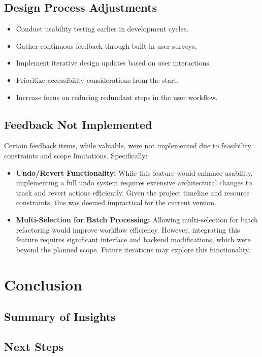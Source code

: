 \documentclass{article}
\begin{document}
\subsection{Design Process Adjustments}
\begin{itemize}
\item Conduct usability testing earlier in development cycles.
\item Gather continuous feedback through built-in user surveys.
\item Implement iterative design updates based on user interactions.
\item Prioritize accessibility considerations from the start.
\item Increase focus on reducing redundant steps in the user workflow.
\end{itemize}

\subsection{Feedback Not Implemented}
Certain feedback items, while valuable, were not implemented due to feasibility constraints and scope limitations. Specifically:
\begin{itemize}
\item \textbf{Undo/Revert Functionality:} While this feature would enhance usability, implementing a full undo system requires extensive architectural changes to track and revert actions efficiently. Given the project timeline and resource constraints, this was deemed impractical for the current version.
\item \textbf{Multi-Selection for Batch Processing:} Allowing multi-selection for batch refactoring would improve workflow efficiency. However, integrating this feature requires significant interface and backend modifications, which were beyond the planned scope. Future iterations may explore this functionality.
\end{itemize}


\newpage
\section{Conclusion}
\subsection{Summary of Insights}
\subsection{Next Steps}
\end{document}
